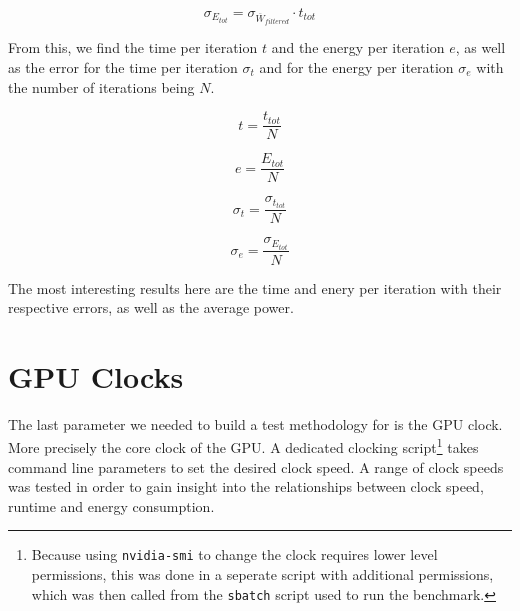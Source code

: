 \begin{equation}
\sigma_{E_{tot}} = \sigma_{\overline{W}_{filtered}} \cdot t_{tot}
\end{equation}

From this, we find the time per iteration \( t \) and the energy per iteration \( e \), as well as the error for the time per iteration \( \sigma_t \) and for the energy per iteration \( \sigma_e \) with the number of iterations being \( N \).

\begin{equation}
t = \frac{t_{tot}}{N}
\end{equation}

\begin{equation}
e = \frac{E_{tot}}{N}
\end{equation}

\begin{equation}
\sigma_t = \frac{\sigma_{t_{tot}}}{N}
\end{equation}

\begin{equation}
\sigma_e = \frac{\sigma_{E_{tot}}}{N}
\end{equation}

The most interesting results here are the time and enery per iteration with their respective errors, as well as the average power.


\section{GPU Clocks}
The last parameter we needed to build a test methodology for is the GPU clock. More precisely the core clock of the GPU. A dedicated clocking script\footnote{Because using \texttt{nvidia-smi} to change the clock requires lower level permissions, this was done in a seperate script with additional permissions, which was then called from the \texttt{sbatch} script used to run the benchmark.} takes command line parameters to set the desired clock speed. A range of clock speeds was tested in order to gain insight into the relationships between clock speed, runtime and energy consumption.